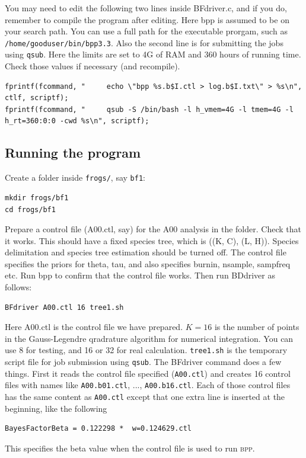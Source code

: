 \documentclass{book}
\numberwithin{equation}{section} \renewcommand{\baselinestretch}{0.55}
\begin{document}
You may need to edit the following two lines inside BFdriver.c, and if
you do, remember to compile the program after editing.  Here bpp is
assumed to be on your search path.  You can use a full path for the
executable prorgam, such as \texttt{/home/gooduser/bin/bpp3.3}.  Also
the second line is for submitting the jobs using \texttt{qsub}.  Here
the limits are set to 4G of RAM and 360 hours of running time.  Check
those values if necessary (and recompile).
\begin{verbatim}
fprintf(fcommand, "     echo \"bpp %s.b$I.ctl > log.b$I.txt\" > %s\n", ctlf, scriptf);
fprintf(fcommand, "     qsub -S /bin/bash -l h_vmem=4G -l tmem=4G -l h_rt=360:0:0 -cwd %s\n", scriptf);
\end{verbatim}

\subsection{Running the program }

Create a folder inside \texttt{frogs/}, say \texttt{bf1}:
\begin{verbatim}
mkdir frogs/bf1
cd frogs/bf1
\end{verbatim}

Prepare a control file (A00.ctl, say) for the A00 analysis in the
folder.  Check that it works.  This should have a fixed species tree,
which is ((K, C), (L, H)).  Species delimitation and species tree
estimation should be turned off.  The control file specifies the
priors for theta, tau, and also specifies burnin, nsample, sampfreq
etc.  Run bpp to confirm that the control file works.  Then run
BDdriver as follows:

\begin{verbatim}
BFdriver A00.ctl 16 tree1.sh
\end{verbatim}

Here A00.ctl is the control file we have prepared.  $K = 16$ is the
number of points in the Gauss-Legendre qradrature algorithm for
numerical integration.  You can use 8 for testing, and 16 or 32 for
real calculation.  \texttt{tree1.sh} is the temporary script file for
job submission using \texttt{qsub}.  The BFdriver command does a few
things.  First it reads the control file specified (\texttt{A00.ctl})
and creates 16 control files with names like \texttt{A00.b01.ctl},
..., \texttt{A00.b16.ctl}.  Each of those control files has the same
content as \texttt{A00.ctl} except that one extra line is inserted at
the beginning, like the following
\begin{verbatim}
BayesFactorBeta = 0.122298 *  w=0.124629.ctl
\end{verbatim}
This specifies the beta value when the control file is used to run
\textsc{bpp}.
\end{document}
